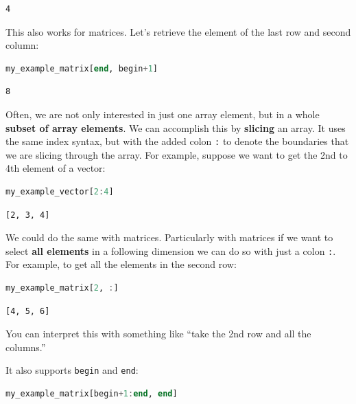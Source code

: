 \documentclass[
  notoc %
]{tufte-book}
\newcommand{\passthrough}[1]{#1}
\begin{document}
\begin{lstlisting}[language=Output]
4
\end{lstlisting}

This also works for matrices. Let's retrieve the element of the last row
and second column:

\begin{lstlisting}[language=Julia]
my_example_matrix[end, begin+1]
\end{lstlisting}

\begin{lstlisting}[language=Output]
8
\end{lstlisting}

Often, we are not only interested in just one array element, but in a
whole \textbf{subset of array elements}. We can accomplish this by
\textbf{slicing} an array. It uses the same index syntax, but with the
added colon \passthrough{\lstinline!:!} to denote the boundaries that we
are slicing through the array. For example, suppose we want to get the
2nd to 4th element of a vector:

\begin{lstlisting}[language=Julia]
my_example_vector[2:4]
\end{lstlisting}

\begin{lstlisting}[language=Output]
[2, 3, 4]
\end{lstlisting}

We could do the same with matrices. Particularly with matrices if we
want to select \textbf{all elements} in a following dimension we can do
so with just a colon \passthrough{\lstinline!:!}. For example, to get
all the elements in the second row:

\begin{lstlisting}[language=Julia]
my_example_matrix[2, :]
\end{lstlisting}

\begin{lstlisting}[language=Output]
[4, 5, 6]
\end{lstlisting}

You can interpret this with something like ``take the 2nd row and all
the columns.''

It also supports \passthrough{\lstinline!begin!} and
\passthrough{\lstinline!end!}:

\begin{lstlisting}[language=Julia]
my_example_matrix[begin+1:end, end]
\end{lstlisting}
\end{document}

